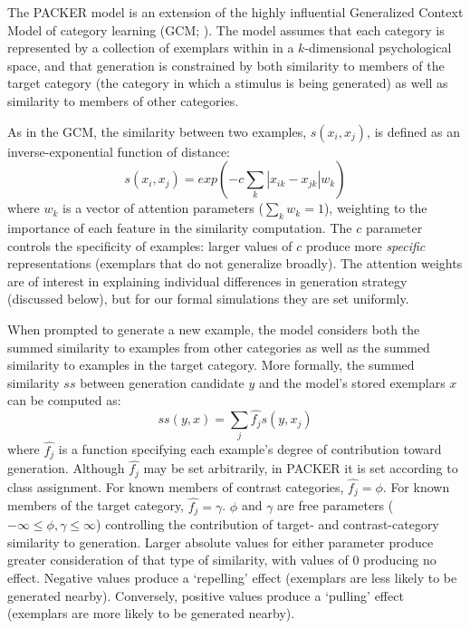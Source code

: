 \documentclass[10pt,letterpaper]{article}
\begin{document}
The PACKER model is an extension of the highly influential Generalized Context Model of category learning (GCM; \citealp{nosofsky1984choice}). The model assumes that each category is represented by a collection of exemplars within in a $k$-dimensional psychological space, and that generation is constrained by both similarity to members of the target category (the category in which a stimulus is being generated) as well as similarity to members of other categories. 

As in the GCM, the similarity between two examples, $s(x_i, x_j)$, is defined as an inverse-exponential function of distance:
\begin{equation}
  s(x_i,x_j) = exp( -c \sum_{k}{|x_{ik} - x_{jk}|}w_k ) 
\end{equation}
where $w_k$ is a vector of attention parameters ($\sum_k{w_k} = 1$), weighting to the importance of each feature in the similarity computation. The $c$ parameter controls the specificity of examples: larger values of $c$ produce more \textit{specific} representations (exemplars that do not generalize broadly). The attention weights are of interest in explaining individual differences in generation strategy (discussed below), but for our formal simulations they are set uniformly.


When prompted to generate a new example, the model considers both the summed similarity to examples from other categories as well as the summed similarity to examples in the target category. More formally, the summed similarity $ss$ between generation candidate $y$ and the model's stored exemplars $x$ can be computed as:
\begin{equation}
  ss(y, x) = \sum_j{\hat{f_j} s(y, x_j)}
\end{equation}
where $\hat{f_j}$ is a function specifying each example's degree of contribution toward generation. Although $\hat{f_j}$ may be set arbitrarily, in PACKER it is set according to class assignment. For known members of contrast categories, $\hat{f_j} = \phi$. For known members of the target category, $\hat{f_j} = \gamma$. $\phi$ and $\gamma$ are free parameters ($-\infty \leq \phi, \gamma \leq \infty$) controlling the contribution of target- and contrast-category similarity to generation. Larger absolute values for either parameter produce greater consideration of that type of similarity, with values of 0 producing no effect. Negative values produce a `repelling' effect (exemplars are less likely to be generated nearby). Conversely, positive values produce a `pulling' effect (exemplars are more likely to be generated nearby). 
\end{document}

